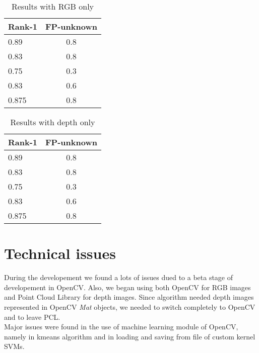 \documentclass{article}
\begin{document}
\begin{table}[]
	\centering
	\caption{Results with RGB only}
	\label{tab:results-rgb}
	\begin{tabular}{|l|c|}
		\hline
		\bf Rank-1 & \bf FP-unknown \\ \hline
		0.89	   & 0.8 \\ \hline
		0.83	   & 0.8 \\ \hline
		0.75	   & 0.3 \\ \hline
		0.83	   & 0.6 \\ \hline
		0.875      & 0.8 \\ \hline
	\end{tabular}
\end{table}
\begin{table}[]
	\centering
	\caption{Results with depth only}
	\label{tab:results-d}
	\begin{tabular}{|l|c|}
		\hline
		\bf Rank-1 & \bf FP-unknown \\ \hline
		0.89	   & 0.8 \\ \hline
		0.83	   & 0.8 \\ \hline
		0.75	   & 0.3 \\ \hline
		0.83	   & 0.6 \\ \hline
		0.875      & 0.8 \\ \hline
	\end{tabular}
\end{table}

\section{Technical issues}
During the developement we found a lots of issues dued to a beta stage of
developement in OpenCV. Also, we began using both OpenCV for RGB images and
Point Cloud Library for depth images. Since algorithm \citep{Fanelli2011}
needed depth images represented in OpenCV \textit{Mat} objects, we needed to
switch completely to OpenCV and to leave PCL.
\\
Major issues were found in the use of machine learning module of OpenCV, namely
in kmeans algorithm and in loading and saving from file of custom kernel SVMs.

\printbibliography
\end{document}
